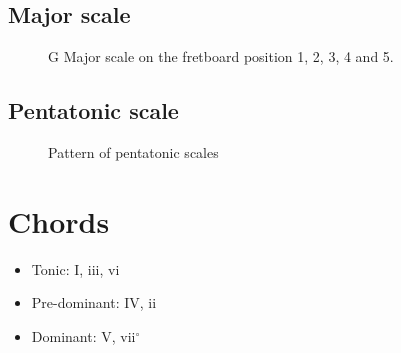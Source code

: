 \documentclass{article}
\begin{document}
\newpage
\subsection{Major scale}


\begin{figure}[h!]
	\centering
	\hspace*{-2cm}
	\scalebox{0.5}{}
	\hspace*{-2cm}
	\scalebox{0.5}{}
	\hspace*{-2cm}
	\scalebox{0.5}{}
	\hspace*{-2cm}
	\scalebox{0.5}{}
	\hspace*{-2cm}
	\scalebox{0.5}{}
	\caption{G Major scale on the fretboard position 1, 2, 3, 4 and 5.}
	\label{fig:gamme_majeure_manche}
\end{figure}

\newpage
\subsection{Pentatonic scale}

\begin{figure}[h!]
	\centering
	\hspace*{-2cm}
	\scalebox{0.5}{}
	\caption{Pattern of pentatonic scales}
	\label{fig:gammme_penta_manche}
\end{figure}


\newpage
\section{Chords}

\begin{itemize}
	\item Tonic: I, iii, vi
	\item Pre-dominant: IV, ii
	\item Dominant: V, vii$^\circ$
\end{itemize}
\end{document}
